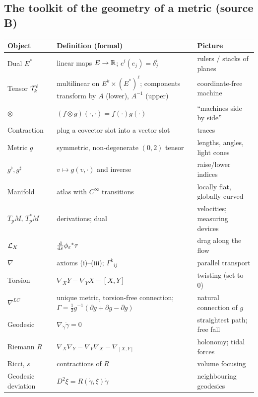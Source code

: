 \subsection{The toolkit of the geometry of a metric (source B)}
\begin{center}
\small
\begin{tabular}{@{}p{3.1cm}p{6.2cm}p{5.4cm}@{}}
\toprule
\textbf{Object} & \textbf{Definition (formal)} & \textbf{Picture}\\ \midrule
Dual $E^*$ & linear maps $E\to\mathbb{R}$; $e^{i}(e_j)=\delta^i_j$ & rulers / stacks of planes\\
Tensor $\mathcal{T}^{\ell}_{k}$ & multilinear on $E^k\times(E^*)^\ell$; components transform by $A$ (lower), $A^{-1}$ (upper) & coordinate-free machine\\
$\otimes$ & $(f\otimes g)(\cdot,\cdot)=f(\cdot)g(\cdot)$ & ``machines side by side''\\
Contraction & plug a covector slot into a vector slot & traces\\
Metric $g$ & symmetric, non-degenerate $(0,2)$ tensor & lengths, angles, light cones\\
$g^\flat,g^\sharp$ & $v\mapsto g(v,\cdot)$ and inverse & raise/lower indices\\
Manifold & atlas with $C^\infty$ transitions & locally flat, globally curved\\
$T_pM$, $T^*_pM$ & derivations; dual & velocities; measuring devices\\
$\mathcal{L}_X$ & $\frac{\mathrm{d}}{\mathrm{d}\varepsilon}\phi_\varepsilon{}^{*}\tau$ & drag along the flow\\
$\nabla$ & axioms (i)--(iii); $\Gamma^k{}_{ij}$ & parallel transport\\
Torsion & $\nabla_XY-\nabla_YX-[X,Y]$ & twisting (set to 0)\\
$\nabla^{LC}$ & unique metric, torsion-free connection; $\Gamma=\tfrac12g^{-1}(\partial g+\partial g-\partial g)$ & natural connection of $g$\\
Geodesic & $\nabla_{\dot\gamma}\dot\gamma=0$ & straightest path; free fall\\
Riemann $R$ & $\nabla_X\nabla_Y-\nabla_Y\nabla_X-\nabla_{[X,Y]}$ & holonomy; tidal forces\\
Ricci, $s$ & contractions of $R$ & volume focusing\\
Geodesic deviation & $D^2\xi=R(\dot\gamma,\xi)\dot\gamma$ & neighbouring geodesics\\ \bottomrule
\end{tabular}
\end{center}
